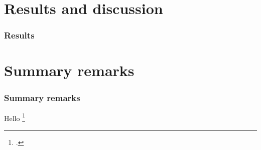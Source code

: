 \documentclass{beamer}
\begin{document}
\begin{frame}
\end{frame}

\section{Results and discussion}

\begin{frame}
    \frametitle{Results}
\end{frame}

\section{Summary remarks}

\begin{frame}
    \frametitle{Summary remarks}
\end{frame}

\begin{frame}
    Hello \footcite{pedersen2018symplectic}
\end{frame}
\end{document}
